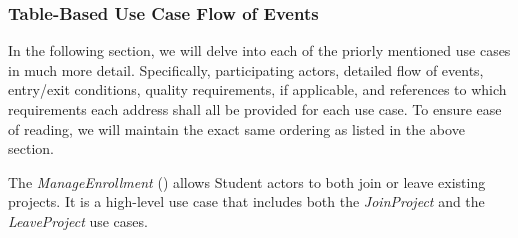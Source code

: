 \documentclass[12pt,letterpaper]{article}
\begin{document}
\subsubsection*{Table-Based Use Case Flow of Events}

In the following section, we will delve into each of the priorly mentioned use cases in much more detail. Specifically, participating actors, detailed flow of events, entry/exit conditions, quality requirements, if applicable, and 
references to which requirements each address shall all be provided for each use case. To ensure ease of reading, we will maintain the exact same ordering as listed in the above section.

\vspace{1em}

The {\it ManageEnrollment} ({\bf \manageenrollment{}}) allows Student actors to both join or leave existing projects. It is a high-level use case that includes both the {\it JoinProject} and the {\it LeaveProject} use cases.
\end{document}
